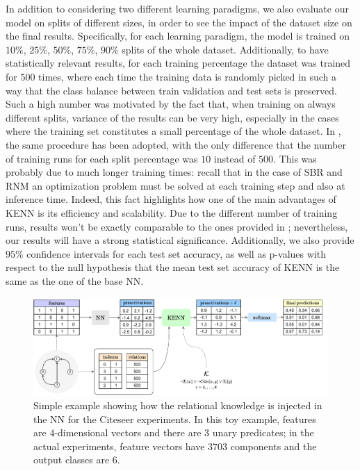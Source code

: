 In addition to considering two different learning paradigms, we also evaluate our model on splits of different sizes, in order to see the impact of the dataset size on the final results. Specifically, for each learning paradigm, the model is trained on $10\%$, $25\%$, $50\%$, $75\%$, $90\%$ splits of the whole dataset. Additionally, to have statistically relevant results, for each training percentage the dataset was trained for $500$ times, where each time the training data is randomly picked in such a way that the class balance between train validation and test sets is preserved. Such a high number was motivated by the fact that, when training on always different splits, variance of the results can be very high, especially in the cases where the training set constitutes a small percentage of the whole dataset. In \cite{marra2020relational}, the same procedure has been adopted, with the only difference that the number of training runs for each split percentage was $10$ instead of $500$. This was probably due to much longer training times: recall that in the case of SBR and RNM an optimization problem must be solved at each training step and also at inference time. Indeed, this fact highlights how one of the main advantages of KENN is its efficiency and scalability. Due to the different number of training runs, results won't be exactly comparable to the ones provided in \cite{marra2020relational}; nevertheless, our results will have a strong statistical significance. Additionally, we also provide $95\%$ confidence intervals for each test set accuracy, as well as \mbox{p-values} with respect to the null hypothesis that the mean test set accuracy of KENN is the same as the one of the base NN.

\begin{figure}
	\centering
	\includegraphics[width=\linewidth]{figures/citeseer_setup.drawio.pdf}
	\caption{Simple example showing how the relational knowledge is injected in the NN for the Citeseer experiments. In this toy example, features are $4$-dimensional vectors and there are $3$ unary predicates; in the actual experiments, feature vectors have $3703$ components and the output classes are $6$.}
	\label{fig:citeseer_setup_chart}
\end{figure}


